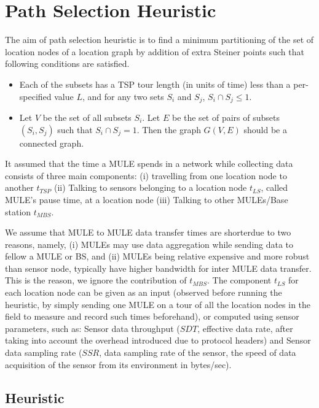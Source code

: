 \section{Path Selection Heuristic}

The aim of path selection heuristic is to find a minimum partitioning of
the set of location nodes of a location graph by addition of 
extra Steiner points such that following conditions are satisfied.

\begin{itemize}
\item Each of the subsets has a TSP tour length (in units of time) less than a per-specified value $L$, and for any two sets $S_{i}$ and $S_{j}$, $S_{i} \cap S_{j} \le 1$.
\item Let $V$ be the set of all subsets $S_{i}$. Let $E$ be the set of pairs of subsets $(S_{i},S_{j})$ such that $S_{i} \cap S_{j} = 1$. Then the graph $G(V,E)$ should be a connected graph.
\end{itemize}

It assumed that the time a MULE spends in a network while collecting data
consists of three main components: (i) travelling from one location node to another $t_{TSP}$ (ii) Talking to sensors belonging to a location node $t_{LS}$, called MULE's pause time, at a location node (iii) Talking to other MULEs/Base station $t_{MBS}$.

We assume that MULE to MULE data transfer times are shorterdue to two reasons, namely, (i) MULEs may use data aggregation while sending data to fellow a MULE or BS, and (ii) MULEs being relative expensive and more robust than sensor node, typically have higher bandwidth for inter MULE data transfer. This is the reason, we ignore the contribution of $t_{MBS}$. The component $t_{LS}$ for each location node can be given as an input (observed before running the heuristic, by simply sending one MULE on a tour of all the location nodes in the field to measure and record such times beforehand), or computed using sensor parameters, such as: Sensor data throughput ($SDT$, effective data rate, after taking into account the overhead introduced due to protocol headers) and Sensor data sampling rate ($SSR$, data sampling rate of the sensor, the speed of data acquisition of the sensor from its environment in bytes/sec).


\subsection{Heuristic}

